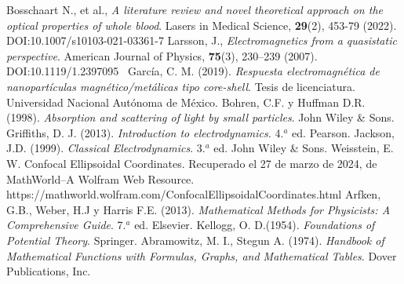 \documentclass[8.5pt,letterpaper]{article}
\begin{document}
\begin{thebibliography}{99}
	 Bosschaart N., et al., \textit{A literature review and novel theoretical approach on the optical properties of whole blood}. Lasers in Medical Science, \textbf{29}(2), 453-79 (2022). DOI:10.1007/s10103-021-03361-7
	 Larsson, J., \textit{Electromagnetics from a quasistatic perspective}. American Journal of Physics, \textbf{75}(3), 230–239 (2007). DOI:10.1119/1.2397095 
	 García, C. M. (2019). \textit{Respuesta electromagnética de nanopartículas magnético/metálicas tipo core-shell}. Tesis de licenciatura. Universidad Nacional Autónoma de México.
	Bohren, C.F. y  Huffman D.R.  (1998). \textit{Absorption and scattering of light by small particles}. John Wiley \& Sons.
	Griffiths, D. J.  (2013). \textit{Introduction to electrodynamics.} 4.$^a$ ed. Pearson.
	Jackson, J.D.  (1999). \textit{Classical Electrodynamics}. 3.$^a$ ed.  John Wiley \& Sons.
	 Weisstein, E. W. Confocal Ellipsoidal Coordinates. Recuperado el 27 de marzo de 2024, de MathWorld--A Wolfram Web Resource. https://mathworld.wolfram.com/ConfocalEllipsoidalCoordinates.html
	 Arfken, G.B., Weber, H.J y Harris F.E. (2013). \textit{Mathematical Methods for Physicists: A Comprehensive Guide}. 7.$^a$ ed. Elsevier.
	 Kellogg, O. D.(1954). \textit{Foundations of Potential Theory}. Springer.
	 Abramowitz, M. I., Stegun A. (1974). \textit{Handbook of Mathematical Functions with Formulas, Graphs, and
		Mathematical Tables}. Dover Publications, Inc.
\end{thebibliography}

	
\end{document}

